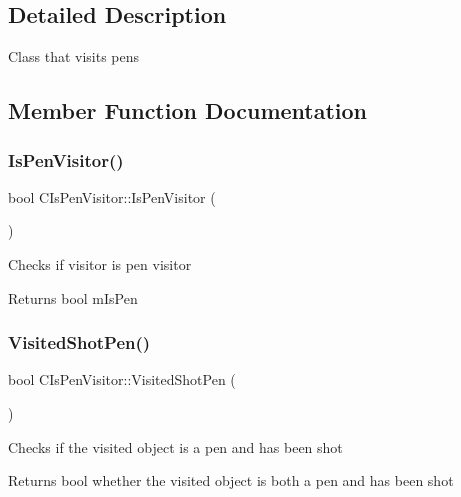 \subsection{Detailed Description}
Class that visits pens 

\subsection{Member Function Documentation}
\mbox{\label{class_c_is_pen_visitor_a6f4f830ad5b5b349448ffc6b3c6c0b2d}} 
\subsubsection{\texorpdfstring{IsPenVisitor()}{IsPenVisitor()}}
{\footnotesize\ttfamily bool C\+Is\+Pen\+Visitor\+::\+Is\+Pen\+Visitor (\begin{DoxyParamCaption}{ }\end{DoxyParamCaption})\hspace{0.3cm}{\ttfamily [inline]}}

Checks if visitor is pen visitor \begin{DoxyReturn}{Returns}
bool m\+Is\+Pen 
\end{DoxyReturn}
\mbox{\label{class_c_is_pen_visitor_a1e540f3b3c1c818da26de7dd5b233dfc}} 
\subsubsection{\texorpdfstring{VisitedShotPen()}{VisitedShotPen()}}
{\footnotesize\ttfamily bool C\+Is\+Pen\+Visitor\+::\+Visited\+Shot\+Pen (\begin{DoxyParamCaption}{ }\end{DoxyParamCaption})\hspace{0.3cm}{\ttfamily [inline]}}

Checks if the visited object is a pen and has been shot \begin{DoxyReturn}{Returns}
bool whether the visited object is both a pen and has been shot 
\end{DoxyReturn}
\mbox{\label{class_c_is_pen_visitor_ae48fb8bb94e5d10877ad5669df4bb86c}} 
